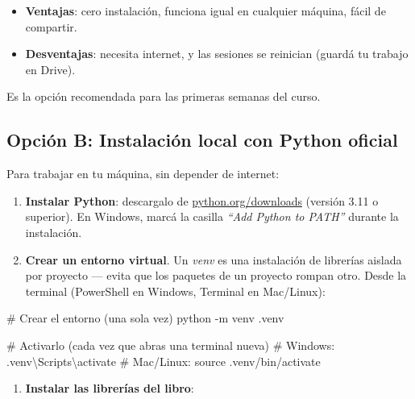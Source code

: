 \documentclass[
  spanish,
  letterpaper,
  DIV=11,
  numbers=noendperiod]{scrreprt}
\newenvironment{Shaded}{\begin{snugshade}}{\end{snugshade}}
\newcommand{\AttributeTok}[1]{\textcolor[rgb]{0.40,0.45,0.13}{#1}}
\newcommand{\BuiltInTok}[1]{\textcolor[rgb]{0.00,0.23,0.31}{#1}}
\newcommand{\CommentTok}[1]{\textcolor[rgb]{0.37,0.37,0.37}{#1}}
\newcommand{\ExtensionTok}[1]{\textcolor[rgb]{0.00,0.23,0.31}{#1}}
\newcommand{\NormalTok}[1]{\textcolor[rgb]{0.00,0.23,0.31}{#1}}
\providecommand{\tightlist}{%
  \setlength{\itemsep}{0pt}\setlength{\parskip}{0pt}}
\begin{document}
\begin{itemize}
\tightlist
\item
  \textbf{Ventajas}: cero instalación, funciona igual en cualquier
  máquina, fácil de compartir.
\item
  \textbf{Desventajas}: necesita internet, y las sesiones se reinician
  (guardá tu trabajo en Drive).
\end{itemize}

Es la opción recomendada para las primeras semanas del curso.

\subsection{Opción B: Instalación local con Python
oficial}\label{opciuxf3n-b-instalaciuxf3n-local-con-python-oficial}

Para trabajar en tu máquina, sin depender de internet:

\begin{enumerate}
\def\labelenumi{\arabic{enumi}.}
\item
  \textbf{Instalar Python}: descargalo de
  \href{https://www.python.org/downloads/}{python.org/downloads}
  (versión 3.11 o superior). En Windows, marcá la casilla \emph{``Add
  Python to PATH''} durante la instalación.
\item
  \textbf{Crear un entorno virtual}. Un \emph{venv} es una instalación
  de librerías aislada por proyecto --- evita que los paquetes de un
  proyecto rompan otro. Desde la terminal (PowerShell en Windows,
  Terminal en Mac/Linux):
\end{enumerate}

\begin{Shaded}
\begin{Highlighting}[]
\CommentTok{\# Crear el entorno (una sola vez)}
\ExtensionTok{python} \AttributeTok{{-}m}\NormalTok{ venv .venv}

\CommentTok{\# Activarlo (cada vez que abras una terminal nueva)}
\CommentTok{\# Windows:}
\ExtensionTok{.venv\textbackslash{}Scripts\textbackslash{}activate}
\CommentTok{\# Mac/Linux:}
\BuiltInTok{source}\NormalTok{ .venv/bin/activate}
\end{Highlighting}
\end{Shaded}

\begin{enumerate}
\def\labelenumi{\arabic{enumi}.}
\setcounter{enumi}{2}
\tightlist
\item
  \textbf{Instalar las librerías del libro}:
\end{enumerate}
\end{document}
